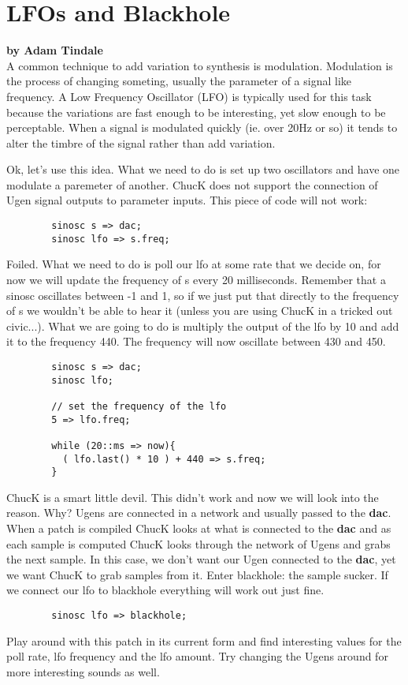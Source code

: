 \section{LFOs and Blackhole}
\textbf{by Adam Tindale}\\

A common technique to add variation to synthesis is modulation. Modulation is the process of changing someting, usually the parameter of a signal like frequency. A Low Frequency Oscillator (LFO) is typically used for this task because the variations are fast enough to be interesting, yet slow enough to be perceptable. When a signal is modulated quickly (ie. over 20Hz or so) it tends to alter the timbre of the signal rather than add variation. 

Ok, let's use this idea. What we need to do is set up two oscillators and have one modulate a paremeter of another. ChucK does not support the connection of Ugen signal outputs to parameter inputs. This piece of code will not work:

\begin{verbatim}
        sinosc s => dac;
        sinosc lfo => s.freq;
\end{verbatim}

Foiled. What we need to do is poll our lfo at some rate that we decide on, for now we will update the frequency of s every 20 milliseconds. Remember that a sinosc oscillates between -1 and 1, so if we just put that directly to the frequency of s we wouldn't be able to hear it (unless you are using ChucK in a tricked out civic...). What we are going to do is multiply the output of the lfo by 10 and add it to the frequency 440. The frequency will now oscillate between 430 and 450. 

\begin{verbatim}
        sinosc s => dac;
        sinosc lfo;

        // set the frequency of the lfo
        5 => lfo.freq;
    
        while (20::ms => now){
          ( lfo.last() * 10 ) + 440 => s.freq;
        }
\end{verbatim}

ChucK is a smart little devil. This didn't work and now we will look into the reason. Why? Ugens are connected in a network and usually passed to the {\bf dac}. When a patch is compiled ChucK looks at what is connected to the {\bf dac} and as each sample is computed ChucK looks through the network of Ugens and grabs the next sample. In this case, we don't want our Ugen connected to the {\bf dac}, yet we want ChucK to grab samples from it. Enter blackhole: the sample sucker. If we connect our lfo to blackhole everything will work out just fine.

\begin{verbatim}
        sinosc lfo => blackhole;
\end{verbatim}

Play around with this patch in its current form and find interesting values for the poll rate, lfo frequency and the lfo amount. Try changing the Ugens around for more interesting sounds as well. 


